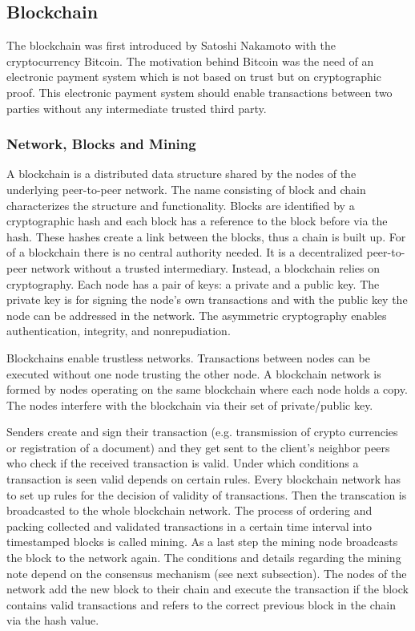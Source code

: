 \documentclass[conference]{IEEEtran}
\begin{document}
\subsection{Blockchain}
The blockchain was first introduced by Satoshi Nakamoto with the cryptocurrency Bitcoin. The motivation behind Bitcoin was the need of an electronic payment system which is not based on trust but on cryptographic proof. This electronic payment system should enable transactions between two parties without any intermediate trusted third party.\cite{Nakamoto2008}
\subsubsection{Network, Blocks and Mining}
A blockchain is a distributed data structure shared by the nodes of the underlying peer-to-peer network. The name consisting of block and chain characterizes the structure and functionality. Blocks are identified by a cryptographic hash and each block has a reference to the block before via the hash. These hashes create a link between the blocks, thus a chain is built up. For of a blockchain there is no central authority needed. It is a decentralized peer-to-peer network without a trusted intermediary. Instead, a blockchain relies on cryptography. Each node has a pair of keys: a private and a public key. The private key is for signing the node's own transactions and with the public key the node can be addressed in the network. The asymmetric cryptography enables authentication, integrity, and nonrepudiation.\cite{Christidis2016} \par
Blockchains enable trustless networks. Transactions between nodes can be executed without one node trusting the other node. A blockchain network is formed by nodes operating on the same blockchain where each node holds a copy. The nodes interfere with the blockchain via their set of private/public key.\cite{Christidis2016} \par
Senders create and sign their transaction (e.g. transmission of crypto currencies or registration of a document) and they get sent to the client's neighbor peers who check if the received transaction is valid. Under which conditions a transaction is seen valid depends on certain rules. Every blockchain network has to set up rules for the decision of validity of transactions. Then the transcation is broadcasted to the whole blockchain network. The process of ordering and packing collected and validated transactions in a certain time interval into timestamped blocks is called mining. As a last step the mining node broadcasts the block to the network again. The conditions and details regarding the mining note depend on the consensus mechanism (see next subsection). The nodes of the network add the new block to their chain and execute the transaction if the block contains valid transactions and refers to the correct previous block in the chain via the hash value.\cite{Christidis2016}\cite{Prinz2017}\par
\end{document}
